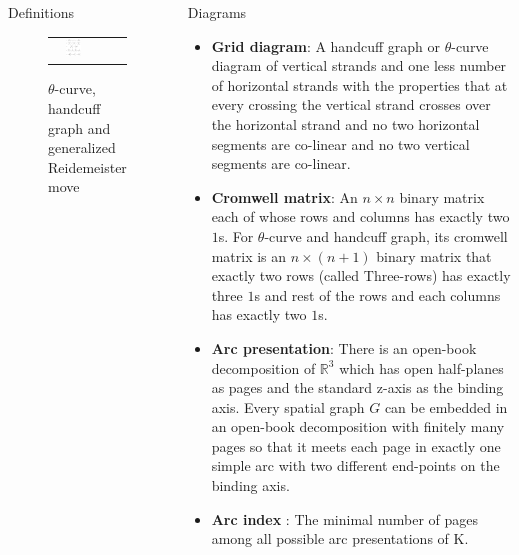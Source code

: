 \documentclass[final]{beamer}
\begin{document}
\begin{frame}[t]
\begin{columns}[t]
\begin{block}{Definitions}
\begin{figure}[h]
\begin{tabular}{ccc}
          \includegraphics[width=0.43\textwidth]{figure/reidemeister.png} \\
        \end{tabular}
        \caption{$\theta$-curve, handcuff graph and generalized Reidemeister move}
    \end{figure}
  \end{block}

  \begin{block}{Diagrams}
    \begin{itemize} 
      \item \textbf{Grid diagram}: A handcuff graph or $\theta$-curve diagram of vertical strands and one less number of horizontal strands with the properties that at every crossing the vertical strand crosses over the horizontal strand and no two horizontal segments are co-linear and no two vertical segments are co-linear.
      \item \textbf{Cromwell matrix}: An $n\times n$ binary matrix each of whose rows and columns has exactly two $1$s. For $\theta$-curve and handcuff graph, its cromwell matrix is an $n\times(n{+}1)$ binary matrix that exactly two rows (called Three-rows) has exactly three $1$s and rest of the rows and each columns has exactly two $1$s.
      \item \textbf{Arc presentation}: There is an open-book decomposition of $\mathbb{R}^3$ which has open half-planes as pages and the standard z-axis as the binding axis. Every spatial graph $G$ can be embedded in an open-book decomposition with finitely many pages so that it meets each page in exactly one simple arc with two different end-points on the binding axis.
      \item \textbf{Arc index} : The minimal number of pages among all possible arc presentations of K.
    \end{itemize}


\end{block}
\end{columns}
\end{frame}
\end{document}
